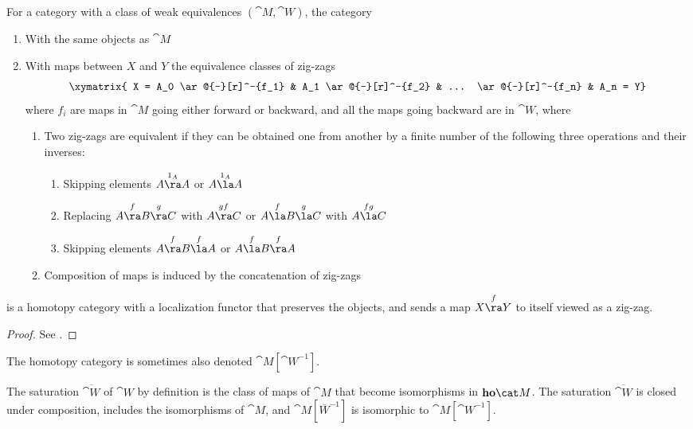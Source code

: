 \begin{thm}
\label{thm:gz}
For a category with a class of weak equivalences $({\cat M}, {\cat W})$, the category 
\begin{enumerate}
\item
With the same objects as ${\cat M}$ 
\item
With maps between $X$ and $Y$ the equivalence classes of zig-zags 
\[
\xymatrix{ X = A_0 \ar@{-}[r]^-{f_1} &  A_1 \ar@{-}[r]^-{f_2} & ... \ar@{-}[r]^-{f_n} & A_n = Y}
\]
where $f_i$ are maps in ${\cat M}$ going either forward or backward, and all the maps going backward are in ${\cat W}$, where
\begin{enumerate}
\item
Two zig-zags are equivalent if they can be obtained one from another by a finite number of the following three operations and their inverses:
\begin{enumerate}
\item
Skipping elements $A \overset{1_{A}}{\ra} A$ or $A \overset{1_{A}}{\la} A$
\item
Replacing $A \overset{f}{\ra} B \overset{g}{\ra} C$ with $A \overset{gf}{\ra} C$ or $A \overset{f}{\la} B \overset{g}{\la} C$ with $A \overset{fg}{\la} C$
\item
Skipping elements $A \overset{f}{\ra} B \overset{f}{\la} A$ or $A \overset{f}{\la} B \overset{f}{\ra} A$
\end{enumerate}
\item
Composition of maps is induced by the concatenation of zig-zags
\end{enumerate}
\end{enumerate}
is a homotopy category with a localization functor that preserves the objects, and sends a map $X \overset{f}{\ra}Y$ to itself viewed as a zig-zag.
\end{thm}

\begin{proof}
See \cite{Gabriel-Zisman}.
\end{proof}

The homotopy category is sometimes also denoted ${\cat M}[{\cat W}^{-1}]$. 

The saturation $\overline{\cat W}$ of ${\cat W}$ by definition is the class of maps of ${\cat M}$ that become isomorphisms in ${\bf ho}{\cat M}$. The saturation $\overline{\cat W}$ is closed under composition, includes the isomorphisms of ${\cat M}$, and ${\cat M}[\overline{W}^{-1}]$ is isomorphic to ${\cat M}[{\cat W}^{-1}]$.


